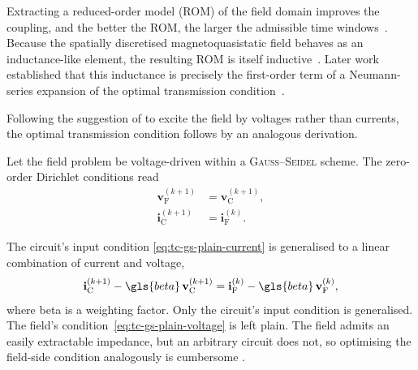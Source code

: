 Extracting a reduced-order model (ROM) of the field domain improves the coupling, and the better the ROM, the larger the admissible time windows~\cite{Schoeps2010,SchoepsDiss}. Because the spatially discretised magnetoquasistatic field behaves as an inductance-like element, the resulting ROM is itself inductive~\cite{Garcia2020}. Later work established that this inductance is precisely the first-order term of a Neumann-series expansion of the optimal transmission condition~\cite{Garcia2017}.

Following the suggestion of \cite{Garcia2017} to excite the field by voltages rather than currents, the optimal transmission condition follows by an analogous derivation.

Let the field problem be voltage-driven within a \textsc{Gauss--Seidel} scheme. The zero-order Dirichlet conditions read
\begin{subequations}\label{eq:tc-gs-plain}
\begin{align}
    \mathbf{v}_{\text{F}}^{(k+1)} &= \mathbf{v}_{\text{C}}^{(k+1)}, \label{eq:tc-gs-plain-voltage} \\
    \mathbf{i}_{\text{C}}^{(k+1)} &= \mathbf{i}_{\text{F}}^{(k)}.   \label{eq:tc-gs-plain-current}
\end{align}
\end{subequations}

The circuit's input condition \eqref{eq:tc-gs-plain-current} is generalised to a linear combination of current and voltage,
\begin{equation}\label{eq:tc-gs-robin}
	\mathbf{i}_{\text{C}}^{(k+1)} - \gls{beta} \, \mathbf{v}_{\text{C}}^{(k+1)} = \mathbf{i}_{\text{F}}^{(k)} - \gls{beta} \, \mathbf{v}_{\text{F}}^{(k)},
\end{equation}
where \gls{beta} is a weighting factor.
Only the circuit's input condition is generalised. The field's condition~\eqref{eq:tc-gs-plain-voltage} is left plain. The field admits an easily extractable impedance, but an arbitrary circuit does not, so optimising the field-side condition analogously is cumbersome \cite{Garcia2017}.

